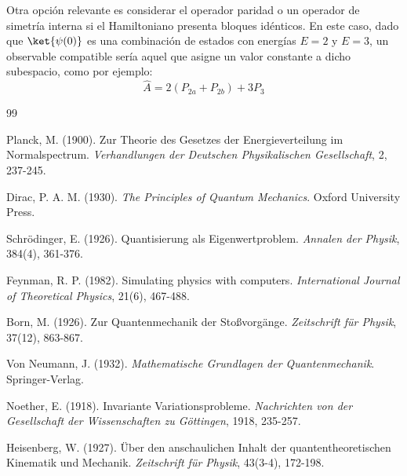 \documentclass[11pt,a4paper,spanish]{book}
\begin{document}
Otra opción relevante es considerar el operador paridad o un operador de simetría interna si el Hamiltoniano presenta bloques idénticos. En este caso, dado que $\ket{\psi(0)}$ es una combinación de estados con energías $E=2$ y $E=3$, un observable compatible sería aquel que asigne un valor constante a dicho subespacio, como por ejemplo:
\begin{equation}
    \hat{A} = 2(P_{2a} + P_{2b}) + 3P_3
\end{equation}


\begin{thebibliography}{99}

Planck, M. (1900). Zur Theorie des Gesetzes der Energieverteilung im Normalspectrum. \emph{Verhandlungen der Deutschen Physikalischen Gesellschaft}, 2, 237-245.

Dirac, P. A. M. (1930). \emph{The Principles of Quantum Mechanics}. Oxford University Press.

Schrödinger, E. (1926). Quantisierung als Eigenwertproblem. \emph{Annalen der Physik}, 384(4), 361-376.

Feynman, R. P. (1982). Simulating physics with computers. \emph{International Journal of Theoretical Physics}, 21(6), 467-488.

Born, M. (1926). Zur Quantenmechanik der Stoßvorgänge. \emph{Zeitschrift für Physik}, 37(12), 863-867.

Von Neumann, J. (1932). \emph{Mathematische Grundlagen der Quantenmechanik}. Springer-Verlag.

Noether, E. (1918). Invariante Variationsprobleme. \emph{Nachrichten von der Gesellschaft der Wissenschaften zu Göttingen}, 1918, 235-257.

Heisenberg, W. (1927). Über den anschaulichen Inhalt der quantentheoretischen Kinematik und Mechanik. \emph{Zeitschrift für Physik}, 43(3-4), 172-198.
\end{thebibliography}
% 
%
\end{document}
